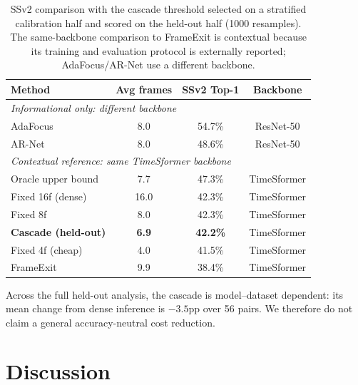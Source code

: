 \documentclass[runningheads]{llncs}
\newcommand{\tabtight}{\setlength{\tabcolsep}{3.5pt}\renewcommand{\arraystretch}{1.10}}
\newcommand{\rev}[1]{\textcolor{revblue}{#1}}
\newcommand{\revdel}[1]{}
\begin{document}
\begin{table}[t]
\centering
\caption{\rev{SSv2 comparison with the cascade threshold selected on a stratified calibration half and scored on the held-out half (1000 resamples). The same-backbone comparison to FrameExit is contextual because its training and evaluation protocol is externally reported; AdaFocus/AR-Net use a different backbone.}}
\label{tab:routing}
\scriptsize\tabtight
\begin{tabular}{l c c c}
\toprule
Method & Avg frames & SSv2 Top-1 & Backbone \\
\midrule
\multicolumn{4}{l}{\textit{Informational only: different backbone}} \\
AdaFocus~\cite{wang2021adafocus} & 8.0 & 54.7\% & ResNet-50 \\
AR-Net~\cite{meng2020arnet}      & 8.0 & 48.6\% & ResNet-50 \\
\midrule
\multicolumn{4}{l}{\revdel{\textit{Controlled comparison: same TimeSformer backbone}}\rev{\textit{Contextual reference: same TimeSformer backbone}}} \\
Oracle upper bound      & 7.7  & 47.3\% & TimeSformer \\
Fixed 16f (dense)       & 16.0 & 42.3\% & TimeSformer \\
Fixed 8f                & 8.0  & 42.3\% & TimeSformer \\
\textbf{\rev{Cascade (held-out)}} & \textbf{\rev{6.9}} & \textbf{\rev{42.2\%}} & TimeSformer \\
Fixed 4f (cheap)        & 4.0  & 41.5\% & TimeSformer \\
FrameExit~\cite{ghodrati2021frameexit} & 9.9 & 38.4\% & TimeSformer \\
\bottomrule
\end{tabular}
\end{table}

\revdel{Across validation model-dataset pairs, 77\% of videos route to cheap 4-frame inference on average. VideoMAE gives the highest absolute routed accuracy, while TimeSformer achieves the highest cheap-routing rates on temporal-critical datasets.} \rev{Across the full held-out analysis, the cascade is model--dataset dependent: its mean change from dense inference is $-3.5$pp over 56 pairs. We therefore do not claim a general accuracy-neutral cost reduction.}

\section{Discussion}
\label{sec:discussion}
\end{document}

